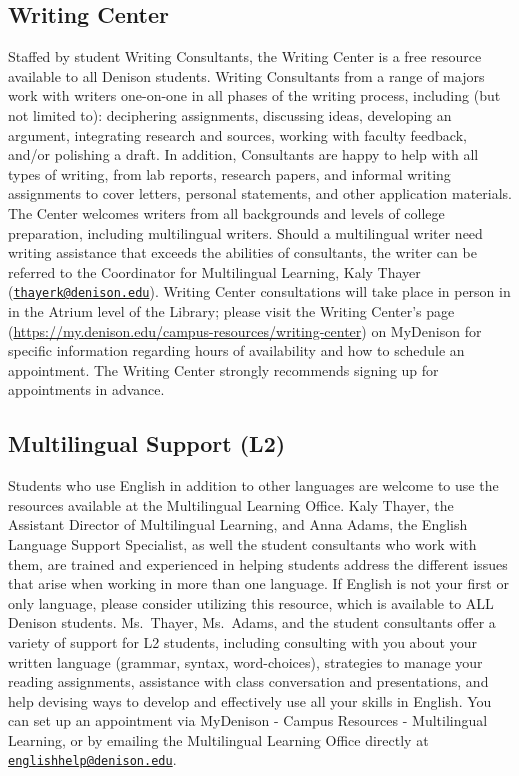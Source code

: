 \documentclass[11pt,]{article}
\begin{document}
\hypertarget{writing-center}{%
\subsection{Writing Center}\label{writing-center}}

Staffed by student Writing Consultants, the Writing Center is a free
resource available to all Denison students. Writing Consultants from a
range of majors work with writers one-on-one in all phases of the
writing process, including (but not limited to): deciphering
assignments, discussing ideas, developing an argument, integrating
research and sources, working with faculty feedback, and/or polishing a
draft. In addition, Consultants are happy to help with all types of
writing, from lab reports, research papers, and informal writing
assignments to cover letters, personal statements, and other application
materials. The Center welcomes writers from all backgrounds and levels
of college preparation, including multilingual writers. Should a
multilingual writer need writing assistance that exceeds the abilities
of consultants, the writer can be referred to the Coordinator for
Multilingual Learning, Kaly Thayer
(\href{mailto:thayerk@denison.edu}{\nolinkurl{thayerk@denison.edu}}).
Writing Center consultations will take place in person in in the Atrium
level of the Library; please visit the Writing Center's page
(\url{https://my.denison.edu/campus-resources/writing-center}) on
MyDenison for specific information regarding hours of availability and
how to schedule an appointment. The Writing Center strongly recommends
signing up for appointments in advance.

\hypertarget{multilingual-support-l2}{%
\subsection{Multilingual Support (L2)}\label{multilingual-support-l2}}

Students who use English in addition to other languages are welcome to
use the resources available at the Multilingual Learning Office. Kaly
Thayer, the Assistant Director of Multilingual Learning, and Anna Adams,
the English Language Support Specialist, as well the student consultants
who work with them, are trained and experienced in helping students
address the different issues that arise when working in more than one
language. If English is not your first or only language, please consider
utilizing this resource, which is available to ALL Denison students.
Ms.~Thayer, Ms.~Adams, and the student consultants offer a variety of
support for L2 students, including consulting with you about your
written language (grammar, syntax, word-choices), strategies to manage
your reading assignments, assistance with class conversation and
presentations, and help devising ways to develop and effectively use all
your skills in English. You can set up an appointment via MyDenison -
Campus Resources - Multilingual Learning, or by emailing the
Multilingual Learning Office directly at
\href{mailto:englishhelp@denison.edu}{\nolinkurl{englishhelp@denison.edu}}.
\end{document}
